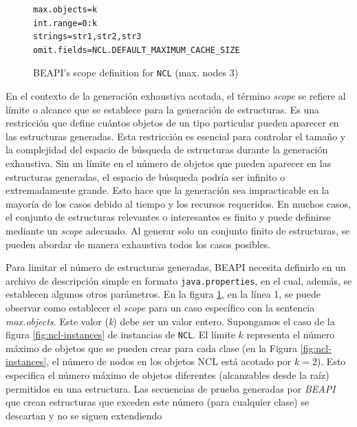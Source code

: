 \begin{figure}[H]
\begin{lstlisting}[keywordstyle=\scriptsize\ttfamily]
max.objects=k
int.range=0:k
strings=str1,str2,str3
omit.fields=NCL.DEFAULT_MAXIMUM_CACHE_SIZE
\end{lstlisting}
\caption{\textsf{BEAPI}'s scope definition for \texttt{NCL} (max. nodes 3)}
\label{fig:NCL-fin-BEAPI}
\end{figure}

En el contexto de la generación exhaustiva acotada, el término \emph{scope} se refiere al límite o alcance que se establece para la generación de estructuras. Es una restricción que define cuántos objetos de un tipo particular pueden aparecer en las estructuras generadas. Esta restricción es esencial para controlar el tamaño y la complejidad del espacio de búsqueda de estructuras durante la generación exhaustiva. Sin un límite en el número de objetos que pueden aparecer en las estructuras generadas, el espacio de búsqueda podría ser infinito o extremadamente grande. Esto hace que la generación sea impracticable en la mayoría de los casos debido al tiempo y los recursos requeridos.  En muchos casos, el conjunto de estructuras relevantes o interesantes es finito y puede definirse mediante un \emph{scope} adecuado. Al generar solo un conjunto finito de estructuras, se pueden abordar de manera exhaustiva todos los casos posibles.

Para limitar el número de estructuras generadas, BEAPI necesita definirlo en un archivo de descripción simple en formato \texttt{java.properties}, en el cual, además, se establecen algunos otros parámetros. En la figura \ref{fig:NCL-fin-BEAPI}, en la línea 1, se puede observar como establecer el \emph{scope} para un caso específico con la sentencia \emph{max.objects}. Este valor (\emph{k}) debe ser un valor entero. Supongamos el caso de la figura \ref{fig:ncl-instances} de instancias de \texttt{NCL}.  El límite $k$ representa el número máximo de objetos que se pueden crear para cada clase (en la Figura \ref{fig:ncl-instances}, el número de nodos en los objetos NCL está acotado por $k=2$). Esto especifica el número máximo de objetos diferentes (alcanzables desde la raíz) permitidos en una estructura. Las secuencias de prueba generadas por \emph{BEAPI} que crean estructuras que exceden este número (para cualquier clase) se descartan y no se siguen extendiendo


